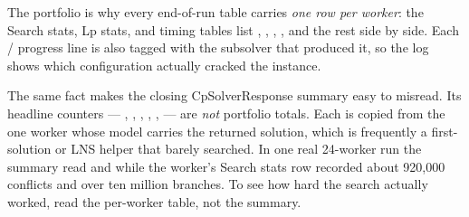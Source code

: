 \begin{platypuslog}[htb]
The portfolio is why every end-of-run table carries \emph{one row per worker}:
the \textsf{Search stats}, \textsf{Lp stats}, and timing tables list
, , , , and the rest side
by side. Each / progress line is also tagged with the
subsolver that produced it, so the log shows which configuration actually
cracked the instance.

The same fact makes the closing \textsf{CpSolverResponse summary} easy to
misread. Its headline counters --- , ,
, , ,
 --- are \emph{not} portfolio totals. Each is copied from the one
worker whose model carries the returned solution, which is frequently a
first-solution or LNS helper that barely searched. In one real 24-worker run the
summary read  and  while the 
worker's \textsf{Search stats} row recorded about 920{,}000 conflicts and over
ten million branches. To see how hard the search actually worked, read the
per-worker table, not the summary.
\end{platypuslog}
